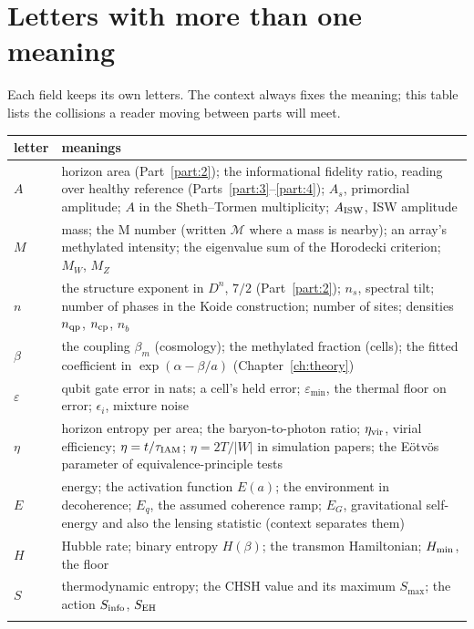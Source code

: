 \section{Letters with more than one meaning}\label{app:notation:clash}
Each field keeps its own letters. The context always fixes the meaning; this table lists the collisions a reader moving between parts will meet.
{\small\begin{longtable}{@{}>{\raggedright\arraybackslash}p{}>{\raggedright\arraybackslash}p{}@{}}
\toprule letter & meanings\\\midrule\endhead
$A$ & horizon area (Part~\ref{part:2}); the informational fidelity ratio, reading over healthy reference (Parts~\ref{part:3}--\ref{part:4}); $A_s$, primordial amplitude; $A$ in the Sheth--Tormen multiplicity; $A_{\rm ISW}$, ISW amplitude\\\iamrowrule
$M$ & mass; the M number (written $\mathcal M$ where a mass is nearby); an array's methylated intensity; the eigenvalue sum of the Horodecki criterion; $M_W$, $M_Z$\\\iamrowrule
$n$ & the structure exponent in $D^n$, $7/2$ (Part~\ref{part:2}); $n_s$, spectral tilt; number of phases in the Koide construction; number of sites; densities $n_{\rm qp}$, $n_{\mathrm{cp}}$, $n_b$\\\iamrowrule
$\beta$ & the coupling $\beta_m$ (cosmology); the methylated fraction (cells); the fitted coefficient in $\exp(\alpha-\beta/a)$ (Chapter~\ref{ch:theory})\\\iamrowrule
$\varepsilon$ & qubit gate error in nats; a cell's held error; $\varepsilon_{\min}$, the thermal floor on error; $\epsilon_i$, mixture noise\\\iamrowrule
$\eta$ & horizon entropy per area; the baryon-to-photon ratio; $\eta_{\rm vir}$, virial efficiency; $\eta=t/\tau_{\rm IAM}$; $\eta=2T/|W|$ in simulation papers; the E\"otv\"os parameter of equivalence-principle tests\\\iamrowrule
$E$ & energy; the activation function $E(a)$; the environment in decoherence; $E_q$, the assumed coherence ramp; $E_G$, gravitational self-energy and also the lensing statistic (context separates them)\\\iamrowrule
$H$ & Hubble rate; binary entropy $H(\beta)$; the transmon Hamiltonian; $H_{\min}$, the floor\\\iamrowrule
$S$ & thermodynamic entropy; the CHSH value and its maximum $S_{\max}$; the action $S_{\rm info}$, $S_{\rm EH}$\\\iamrowrule

\end{longtable}}
